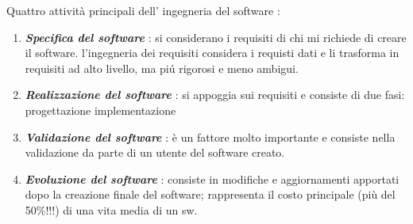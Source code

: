 \documentclass[a4paper, 10pt]{article}
\begin{document}
	
	\noindent
	Quattro attività principali dell' ingegneria del software :
	\begin{enumerate}
		\item \textbf{\textit{Specifica del software}} : si considerano i requisiti di chi mi richiede di
		creare il software.
			\subitem{-} l'ingegneria dei requisiti considera i requisti dati e li trasforma in
			requisiti ad alto livello, ma piú rigorosi e meno ambigui.
		\item \textbf{\textit{Realizzazione del software}} : si appoggia sui requisiti e consiste di due fasi:
			\subitem{-} progettazione
			\subitem{-} implementazione
		\item \textbf{\textit{Validazione del software}} : è un fattore molto importante e consiste nella
		validazione da parte di un utente del software creato.
		\item \textbf{\textit{Evoluzione del software}} : consiste in modifiche e aggiornamenti apportati
		dopo la creazione finale del software; rappresenta il costo principale
		(più del 50\%!!!) di una vita media di un sw.
	\end{enumerate}
	
	
\end{document}
